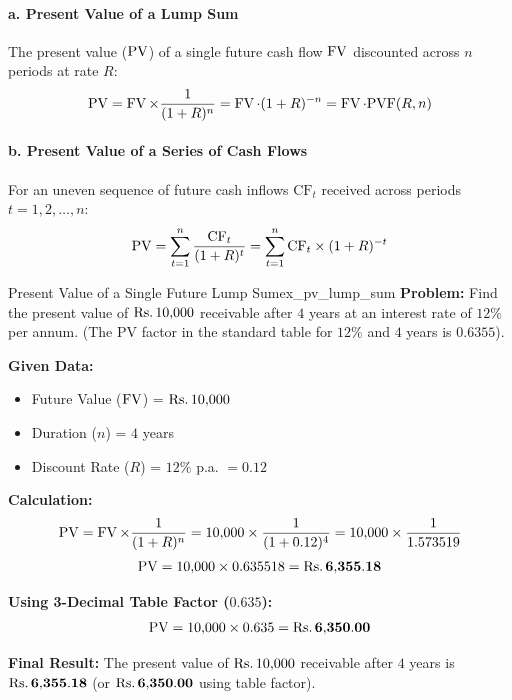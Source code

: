 \begin{formulabox}
\paragraph{a. Present Value of a Lump Sum}
The present value ($\operatorname{PV}$) of a single future cash flow $\operatorname{FV}$ discounted across $n$ periods at rate $R$:
\begin{equation}
    \operatorname{PV} = \operatorname{FV} \times \frac{1}{(1 + R)^n} = \operatorname{FV} \cdot (1 + R)^{-n} = \operatorname{FV} \cdot \text{PVF}(R, n)
\end{equation}

\vspace{0.4em}
\paragraph{b. Present Value of a Series of Cash Flows}
For an uneven sequence of future cash inflows $\text{CF}_t$ received across periods $t = 1, 2, \dots, n$:
\begin{equation}
    \operatorname{PV} = \sum_{t=1}^{n} \frac{\text{CF}_t}{(1 + R)^t} = \sum_{t=1}^{n} \text{CF}_t \times (1 + R)^{-t}
\end{equation}
\end{formulabox}

\begin{example}{Present Value of a Single Future Lump Sum}{ex_pv_lump_sum}
\textbf{Problem:}
Find the present value of $\text{Rs.}\, 10{,}000$ receivable after $4$ years at an interest rate of $12\%$ per annum. (The PV factor in the standard table for $12\%$ and $4$ years is $0.6355$).

\tcbline
\textbf{Given Data:}
\begin{itemize}[noitemsep]
    \item Future Value ($\operatorname{FV}$) = $\text{Rs.}\, 10{,}000$
    \item Duration ($n$) = $4$ years
    \item Discount Rate ($R$) = $12\%$ p.a. $= 0.12$
\end{itemize}

\textbf{Calculation:}
\begin{equation*}
    \operatorname{PV} = \operatorname{FV} \times \frac{1}{(1 + R)^n} = 10{,}000 \times \frac{1}{(1 + 0.12)^4} = 10{,}000 \times \frac{1}{1.573519}
\end{equation*}
\begin{equation*}
    \operatorname{PV} = 10{,}000 \times 0.635518 = \mathbf{\text{Rs.}\, 6{,}355.18}
\end{equation*}

\textbf{Using 3-Decimal Table Factor ($0.635$):}
\begin{equation*}
    \operatorname{PV} = 10{,}000 \times 0.635 = \mathbf{\text{Rs.}\, 6{,}350.00}
\end{equation*}

\textbf{Final Result:}
The present value of $\text{Rs.}\, 10{,}000$ receivable after $4$ years is $\mathbf{\text{Rs.}\, 6{,}355.18}$ (or $\mathbf{\text{Rs.}\, 6{,}350.00}$ using table factor).
\end{example}

